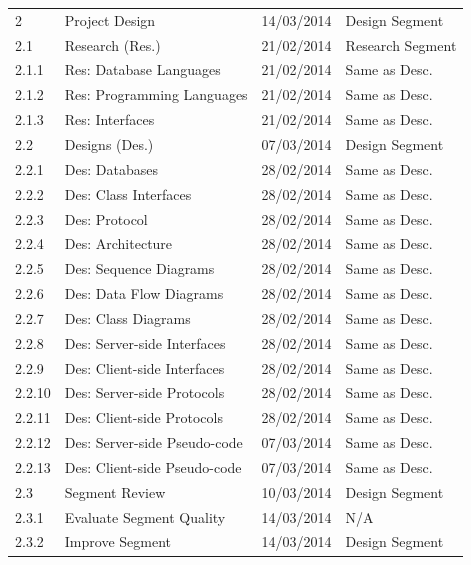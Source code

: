 \begin{tabular}{llrl}
    \midrule
    
    2        & Project Design               & 14/03/2014  & Design Segment    \\
    
    \cmidrule(r){2-3}
    2.1      & Research (Res.)              & 21/02/2014  & Research Segment  \\
    2.1.1    & Res: Database Languages      & 21/02/2014  & Same as Desc.     \\
    2.1.2    & Res: Programming Languages   & 21/02/2014  & Same as Desc.     \\
    2.1.3    & Res: Interfaces              & 21/02/2014  & Same as Desc.     \\
    \cmidrule(r){2-3}
    
    2.2      & Designs (Des.)               & 07/03/2014  & Design Segment    \\
    2.2.1    & Des: Databases               & 28/02/2014  & Same as Desc.     \\
    2.2.2    & Des: Class Interfaces        & 28/02/2014  & Same as Desc.     \\
    2.2.3    & Des: Protocol                & 28/02/2014  & Same as Desc.     \\
    2.2.4    & Des: Architecture            & 28/02/2014  & Same as Desc.     \\
    2.2.5    & Des: Sequence Diagrams       & 28/02/2014  & Same as Desc.     \\
    2.2.6    & Des: Data Flow Diagrams      & 28/02/2014  & Same as Desc.     \\
    2.2.7    & Des: Class Diagrams          & 28/02/2014  & Same as Desc.     \\
    2.2.8    & Des: Server-side Interfaces  & 28/02/2014  & Same as Desc.     \\
    2.2.9    & Des: Client-side Interfaces  & 28/02/2014  & Same as Desc.     \\
    2.2.10   & Des: Server-side Protocols   & 28/02/2014  & Same as Desc.     \\
    2.2.11   & Des: Client-side Protocols   & 28/02/2014  & Same as Desc.     \\
    2.2.12   & Des: Server-side Pseudo-code & 07/03/2014  & Same as Desc.     \\
    2.2.13   & Des: Client-side Pseudo-code & 07/03/2014  & Same as Desc.     \\
    \cmidrule(r){2-3}
    
    2.3      & Segment Review               & 10/03/2014  & Design Segment    \\
    2.3.1    & Evaluate Segment Quality     & 14/03/2014  & N/A               \\
    2.3.2    & Improve Segment              & 14/03/2014  & Design Segment    \\
    

\end{tabular}

